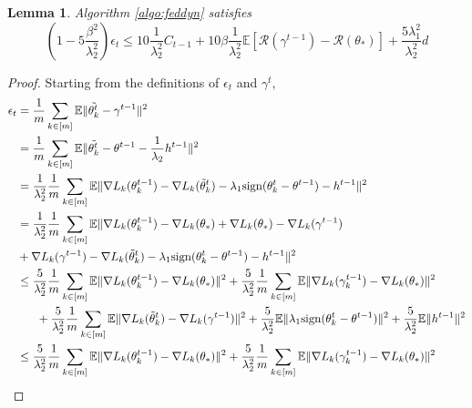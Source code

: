 \documentclass{article} %
\newtheorem{lemma}[theorem]{Lemma}
\begin{document}
\begin{lemma}\label{boundepsilon}
Algorithm \ref{algo:feddyn} satisfies 
\begin{equation*}
    (1-5\frac{\beta^2}{\lambda_2^2})\epsilon_t\le10\frac{1}{\lambda_2^2}C_{t-1}+10\beta\frac{1}{\lambda_2^2}\mathbb{E}[\mathcal{R}(\gamma^{t-1})-\mathcal{R}(\theta_*)]+\frac{5\lambda_1^2}{\lambda_2^2}d
\end{equation*}
\end{lemma}
\begin{proof}
Starting from the definitions of $\epsilon_t$ and $\gamma^t$,
\begin{align}
    \epsilon_t &=\frac{1}{m}\sum_{k\in[m]}\mathbb{E}\lVert \Tilde{\theta_k^t}-\gamma^{t-1} \rVert^2 \nonumber \\
    &= \frac{1}{m}\sum_{k\in[m]}\mathbb{E}\lVert \Tilde{\theta_k^t}-\theta^{t-1}-\frac{1}{\lambda_2}h^{t-1}\rVert^2 \nonumber \\
    &\label{epsilon3}= \frac{1}{\lambda_2^2}\frac{1}{m}\sum_{k\in [m]}\mathbb{E}\lVert \nabla L_k(\theta_k^{t-1}) -\nabla L_k(\Tilde{\theta}_k^t)-\lambda_1\mathrm{sign}(\theta_k^t-\theta^{t-1}) -h^{t-1} \rVert^2\\
    &= \frac{1}{\lambda_2^2}\frac{1}{m}\sum_{k\in [m]}\mathbb{E}\lVert \nabla L_k(\theta_k^{t-1}) -\nabla L_k(\theta_*) + \nabla L_k(\theta_*) -\nabla L_k(\gamma^{t-1}) \nonumber \\
    & +\nabla L_k(\gamma^{t-1}) -\nabla  L_k(\Tilde{\theta}_k^t) - \lambda_1\mathrm{sign}(\theta_k^t-\theta^{t-1}) -h^{t-1} \rVert^2 \nonumber \\
    &\le \nonumber\frac{5}{\lambda_2^2}\frac{1}{m}\sum_{k\in[m]}\mathbb{E}\lVert \nabla L_k(\theta_k^{t-1})-\nabla L_k(\theta_*) \rVert^2 
    + \frac{5}{\lambda_2^2}\frac{1}{m}\sum_{k\in[m]}\mathbb{E}\lVert \nabla L_k(\gamma_k^{t-1})-\nabla L_k(\theta_*) \rVert^2 \nonumber \\
    &\ \ \ \ \ + \frac{5}{\lambda_2^2}\frac{1}{m}\sum_{k\in[m]}\mathbb{E}\lVert \nabla L_k(\Tilde{\theta}_k^t)-\nabla L_k(\gamma^{t-1}) \rVert^2
    +\frac{5}{\lambda_2^2}\mathbb{E}\lVert \lambda_1\mathrm{sign}(\theta_k^t-\theta^{t-1}) \rVert^2+\frac{5}{\lambda_2^2}\mathbb{E}\lVert h^{t-1} \rVert^2 \label{epsilon5} \\
    &\label{epsilon6}\le \nonumber\frac{5}{\lambda_2^2}\frac{1}{m}\sum_{k\in[m]}\mathbb{E}\lVert \nabla L_k(\theta_k^{t-1})-\nabla L_k(\theta_*) \rVert^2 
    + \frac{5}{\lambda_2^2}\frac{1}{m}\sum_{k\in[m]}\mathbb{E}\lVert \nabla L_k(\gamma_k^{t-1})-\nabla L_k(\theta_*) \rVert^2 \\

\end{align}
\end{proof}
\end{document}
